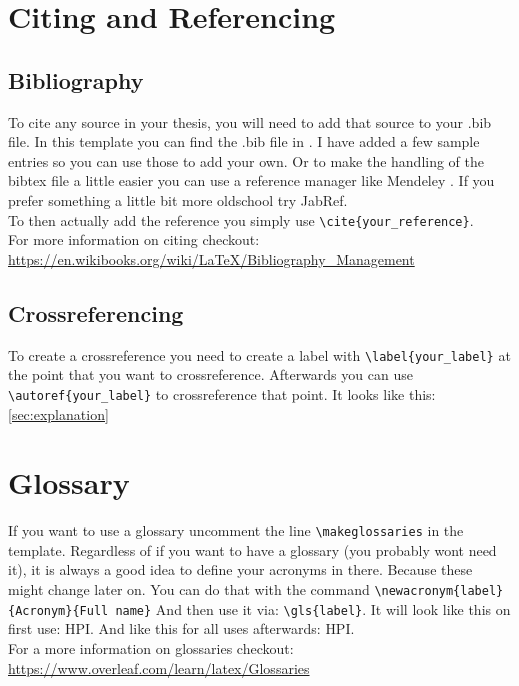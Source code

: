 \section{Citing and Referencing}

\subsection{Bibliography}
To cite any source in your thesis, you will need to add that source to your .bib file.
In this template you can find the .bib file in .
I have added a few sample entries so you can use those to add your own.
Or to make the handling of the bibtex file a little easier you can use a reference manager like Mendeley \cite{mendeley}.
If you prefer something a little bit more oldschool try JabRef.\\
To then actually add the reference you simply use \verb|\cite{your_reference}|.\\
For more information on citing checkout: \url{https://en.wikibooks.org/wiki/LaTeX/Bibliography_Management}

\subsection{Crossreferencing}
To create a crossreference you need to create a label with \verb|\label{your_label}| at the point that you want to crossreference. Afterwards you can use \verb|\autoref{your_label}| to crossreference that point. It looks like this: \autoref{sec:explanation} 

\section{Glossary}
If you want to use a glossary uncomment the line \verb|\makeglossaries| in the template.
Regardless of if you want to have a glossary (you probably wont need it), it is always a good idea to define your acronyms in there.
Because these might change later on.
You can do that with the command \verb|\newacronym{label}{Acronym}{Full name}| And then use it via: \verb|\gls{label}|. It will look like this on first use: \gls{HPI}. And like this for all uses afterwards: \gls{HPI}.\\

For a more information on glossaries checkout: \url{https://www.overleaf.com/learn/latex/Glossaries}


